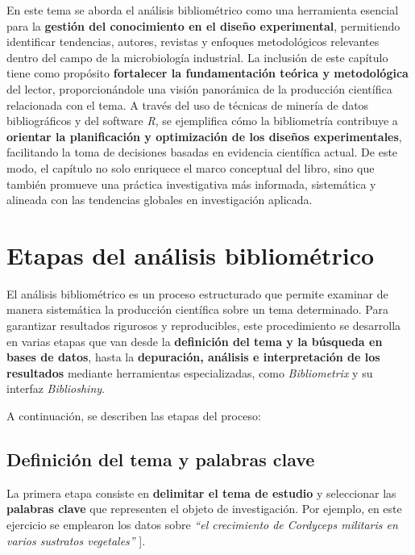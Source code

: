 \documentclass[
  spanish,
  letterpaper,
  DIV=11,
  numbers=noendperiod]{scrreprt}
\begin{document}
En este tema se aborda el análisis bibliométrico como una herramienta
esencial para la \textbf{gestión del conocimiento en el diseño
experimental}, permitiendo identificar tendencias, autores, revistas y
enfoques metodológicos relevantes dentro del campo de la microbiología
industrial. La inclusión de este capítulo tiene como propósito
\textbf{fortalecer la fundamentación teórica y metodológica} del lector,
proporcionándole una visión panorámica de la producción científica
relacionada con el tema. A través del uso de técnicas de minería de
datos bibliográficos y del software \emph{R}, se ejemplifica cómo la
bibliometría contribuye a \textbf{orientar la planificación y
optimización de los diseños experimentales}, facilitando la toma de
decisiones basadas en evidencia científica actual. De este modo, el
capítulo no solo enriquece el marco conceptual del libro, sino que
también promueve una práctica investigativa más informada, sistemática y
alineada con las tendencias globales en investigación aplicada.

\section{Etapas del análisis
bibliométrico}\label{etapas-del-anuxe1lisis-bibliomuxe9trico}

El análisis bibliométrico es un proceso estructurado que permite
examinar de manera sistemática la producción científica sobre un tema
determinado. Para garantizar resultados rigurosos y reproducibles, este
procedimiento se desarrolla en varias etapas que van desde la
\textbf{definición del tema y la búsqueda en bases de datos}, hasta la
\textbf{depuración, análisis e interpretación de los resultados}
mediante herramientas especializadas, como \emph{Bibliometrix} y su
interfaz \emph{Biblioshiny}.

A continuación, se describen las etapas del proceso:

\subsection{Definición del tema y palabras
clave}\label{definiciuxf3n-del-tema-y-palabras-clave}

La primera etapa consiste en \textbf{delimitar el tema de estudio} y
seleccionar las \textbf{palabras clave} que representen el objeto de
investigación. Por ejemplo, en este ejercicio se emplearon los datos
sobre \emph{``el crecimiento de Cordyceps militaris en varios sustratos
vegetales''} {]}.
\end{document}
